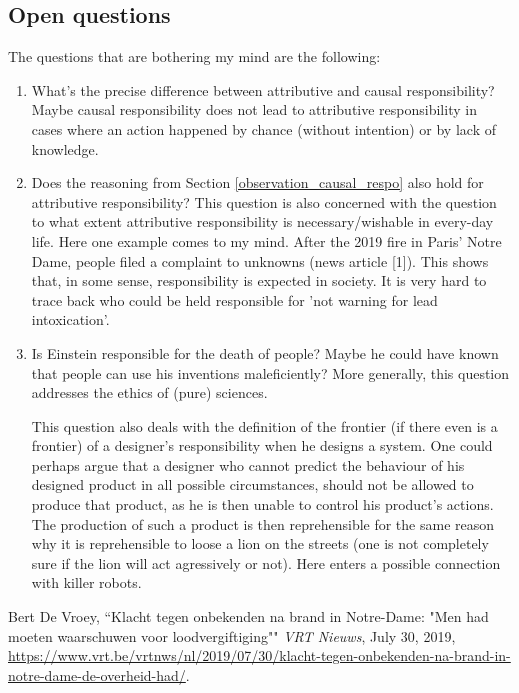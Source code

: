 \documentclass[../main/main.tex]{subfiles}
\begin{document}
\subsection{Open questions}
The questions that are bothering my mind are the following:
\begin{enumerate}
\item What's the precise difference between attributive and causal responsibility? Maybe causal responsibility does not lead to attributive responsibility in cases where an action happened by chance (without intention) or by lack of knowledge. 

\item Does the reasoning from Section \ref{observation_causal_respo} also hold for attributive responsibility? This question is also concerned with the question to what extent attributive responsibility is necessary/wishable in every-day life. Here one example comes to my mind. After the 2019 fire in Paris' Notre Dame, people filed a complaint to unknowns (news article [1]). This shows that, in some sense, responsibility is expected in society. It is very hard to trace back who could be held responsible for 'not warning for lead intoxication'.

\item Is Einstein responsible for the death of people? Maybe he could have known that people can use his inventions maleficiently? More generally, this question addresses the ethics of (pure) sciences. 

This question also deals with the definition of the frontier (if there even is a frontier) of a designer's responsibility when he designs a system. One could perhaps argue that a designer who cannot predict the behaviour of his designed product in all possible circumstances, should not be allowed to produce that product, as he is then unable to control his product's actions. The production of such a product is then reprehensible for the same reason why it is reprehensible to loose a lion on the streets (one is not completely sure if the lion will act agressively or not). Here enters a possible connection with killer robots. 
\end{enumerate}

\begin{thebibliography}{100}  
 Bert De Vroey, ``Klacht tegen onbekenden na brand in Notre-Dame: "Men had moeten waarschuwen voor loodvergiftiging"" \emph{VRT Nieuws}, July 30, 2019, \url{https://www.vrt.be/vrtnws/nl/2019/07/30/klacht-tegen-onbekenden-na-brand-in-notre-dame-de-overheid-had/}.
\end{thebibliography}
\end{document}
